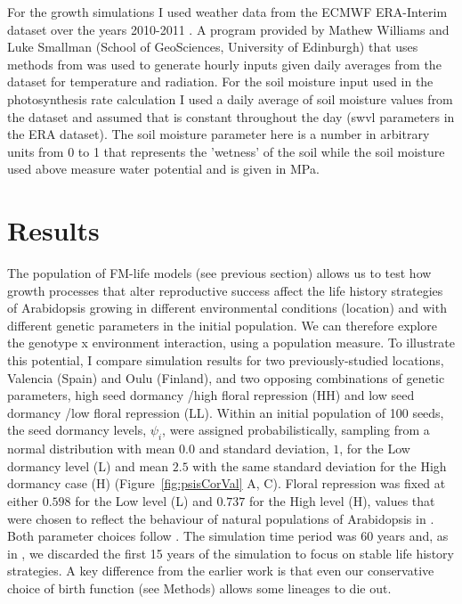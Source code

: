 For the growth simulations I used weather data from the ECMWF ERA-Interim
dataset over the years 2010-2011 \citep{dee_era-interim_2011}.  A program
provided by Mathew Williams and Luke Smallman (School of GeoSciences, University
of Edinburgh) that uses methods from \citet{williams_primary_2001} was used to
generate hourly inputs given daily averages from the dataset for temperature and
radiation. For the soil moisture input used in the photosynthesis rate
calculation I used a daily average of soil moisture values from the dataset and
assumed that is constant throughout the day (swvl parameters in the ERA
dataset). The soil moisture parameter here is a number in arbitrary units from 0
to 1 that represents the 'wetness' of the soil while the soil moisture used
above measure water potential and is given in MPa.

\section{Results}
\label{sec:results}
The population of FM-life models (see previous section) allows us to test how
growth processes that alter reproductive success affect the life history
strategies of Arabidopsis growing in different environmental conditions
(location) and with different genetic parameters in the initial population. We
can therefore explore the genotype x environment interaction, using a population
measure. To illustrate this potential, I compare simulation results for two
previously-studied locations, Valencia (Spain) and Oulu (Finland), and two
opposing combinations of genetic parameters, high seed dormancy /high floral
repression (HH) and low seed dormancy /low floral repression (LL). Within an
initial population of 100 seeds, the seed dormancy levels, \(\psi_{i}\), were
assigned probabilistically, sampling from a normal distribution with mean
\(0.0\) and standard deviation, \(1\), for the Low dormancy level (L) and mean
\(2.5\) with the same standard deviation for the High dormancy case (H)
(Figure~\ref{fig:psisCorVal} A, C). Floral repression was fixed at either
\(0.598\) for the Low level (L) and \(0.737\) for the High level (H), values
that were chosen to reflect the behaviour of natural populations of Arabidopsis
in \citet{wilczek_effects_2009}. Both parameter choices follow
\citet{burghardt_modeling_2015}. The simulation time period was 60 years and, as
in \citet{burghardt_modeling_2015}, we discarded the first 15 years of the
simulation to focus on stable life history strategies. A key difference from the
earlier work is that even our conservative choice of birth function (see
Methods) allows some lineages to die out.

